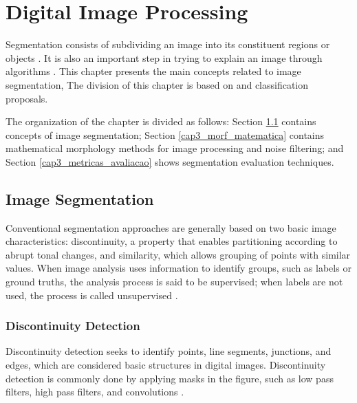 \chapter{Digital Image Processing}
\label{cap3_seg_imagens}


Segmentation consists of subdividing an image into its constituent regions or objects \cite[Ch. 10]{gonzalez2002digital}.
It is also an important step in trying to explain an image through algorithms \cite{Zhang08imagesegmentation}. 
This chapter presents the main concepts related to image segmentation,
The division of this chapter is based on \cite{gonzalez2018digital} and \cite{pedrini2008analise} classification proposals.

The organization of the chapter is divided as follows: Section \ref{cap3_detect_bordas_segment} contains concepts of image segmentation;
Section \ref{cap3_morf_matematica} contains mathematical morphology methods for image processing and noise filtering;
and Section \ref{cap3_metricas_avaliacao} shows segmentation evaluation techniques.

\section{Image Segmentation}
\label{cap3_detect_bordas_segment}

Conventional segmentation approaches are generally based on two basic image characteristics: discontinuity, a property that enables partitioning according to abrupt tonal changes, and similarity, which allows grouping of points with similar values.
When image analysis uses information to identify groups, such as labels or ground truths, the analysis process is said to be supervised; when labels are not used, the process is called unsupervised \cite{gonzalez2002digital}. %

\subsection{Discontinuity Detection}
\label{cap3_descontinuidades}

Discontinuity detection seeks to identify points, line segments, junctions, and edges, which are considered basic structures in digital images.
Discontinuity detection is commonly done by applying masks in the figure, such as low pass filters, high pass filters, and convolutions  \cite{gonzalez2002digital}. %

